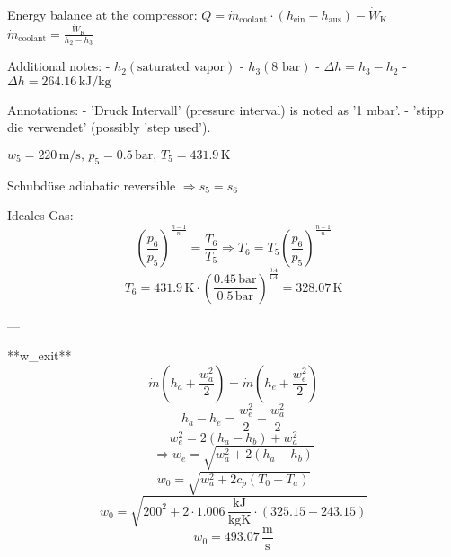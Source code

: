 Energy balance at the compressor:  
\( Q = \dot{m}_{\text{coolant}} \cdot (h_{\text{ein}} - h_{\text{aus}}) - \dot{W}_{\text{K}} \)  
\( \dot{m}_{\text{coolant}} = \frac{\dot{W}_{\text{K}}}{h_2 - h_3} \)  

Additional notes:  
- \( h_2 (\text{saturated vapor}) \)  
- \( h_3 (\text{8 bar}) \)  
- \( \Delta h = h_3 - h_2 \)  
- \( \Delta h = 264.16 \, \text{kJ/kg} \)  

Annotations:  
- 'Druck Intervall' (pressure interval) is noted as '1 mbar'.  
- 'stipp die verwendet' (possibly 'step used').

\( w_5 = 220 \, \text{m/s}, \, p_5 = 0.5 \, \text{bar}, \, T_5 = 431.9 \, \text{K} \)  

Schubdüse adiabatic reversible \( \Rightarrow s_5 = s_6 \)  

Ideales Gas:  
\[
\left( \frac{p_6}{p_5} \right)^{\frac{n-1}{n}} = \frac{T_6}{T_5} \Rightarrow T_6 = T_5 \left( \frac{p_6}{p_5} \right)^{\frac{n-1}{n}}
\]  
\[
T_6 = 431.9 \, \text{K} \cdot \left( \frac{0.45 \, \text{bar}}{0.5 \, \text{bar}} \right)^{\frac{0.4}{1.4}} = 328.07 \, \text{K}
\]  

---

**w_exit**  
\[
\dot{m} (h_a + \frac{w_a^2}{2}) = \dot{m} (h_e + \frac{w_e^2}{2})
\]  
\[
h_a - h_e = \frac{w_e^2}{2} - \frac{w_a^2}{2}
\]  
\[
w_e^2 = 2 (h_a - h_b) + w_a^2
\]  
\[
\Rightarrow w_e = \sqrt{w_a^2 + 2 (h_a - h_b)}
\]  
\[
w_0 = \sqrt{w_a^2 + 2 c_p (T_0 - T_a)}
\]  
\[
w_0 = \sqrt{200^2 + 2 \cdot 1.006 \, \frac{\text{kJ}}{\text{kgK}} \cdot (325.15 - 243.15)}
\]  
\[
w_0 = 493.07 \, \frac{\text{m}}{\text{s}}
\]